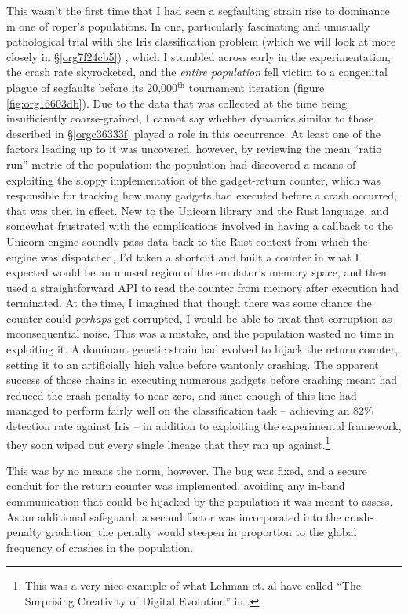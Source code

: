 \documentclass[12pt,glossary]{dalthesis}
\begin{document}
This wasn't the first time that I had seen a segfaulting strain rise to
dominance in one of \gls{roper}'s populations. In one, particularly fascinating
and unusually pathological trial with the Iris classification problem (which we
will look at more closely in \S \ref{org7f24cb5}) , which I stumbled
across early in the experimentation, the crash rate skyrocketed, and the \emph{entire
population} fell victim to a congenital plague of segfaults before its
20,000\(^{\text{th}}\) tournament iteration (figure \ref{fig:org16603db}). Due to the data that
was collected at the time being insufficiently coarse-grained, I cannot say
whether dynamics similar to those described in \S \ref{orgc36333f} played
a role in this occurrence. At least one of the factors leading up to it was
uncovered, however, by reviewing the mean ``ratio run'' metric of the population:
the population had discovered a means of exploiting the sloppy implementation of
the gadget-return counter, which was responsible for tracking how many gadgets
had executed before a crash occurred, that was then in effect. New to the
Unicorn library and the Rust language, and somewhat frustrated with the
complications involved in having a callback to the Unicorn engine soundly pass
data back to the Rust context from which the engine was dispatched, I'd taken a
shortcut and built a counter in what I expected would be an unused region of the
emulator's memory space, and then used a straightforward API to read the counter
from memory after execution had terminated. At the time, I imagined that though
there was some chance the counter could \emph{perhaps} get corrupted, I would be able
to treat that corruption as inconsequential noise. This was a mistake, and the
population wasted no time in exploiting it. A dominant genetic strain had
evolved to hijack the return counter, setting it to an artificially high value
before wantonly crashing. The apparent success of those chains in executing
numerous gadgets before crashing meant had reduced the crash penalty to near
zero, and since enough of this line had managed to perform fairly well on the
classification task -- achieving an 82\% detection rate against Iris -- in
addition to exploiting the experimental framework, they soon wiped out every
single lineage that they ran up against.\footnote{This was a very nice example of
what Lehman et. al have called ``The Surprising Creativity of Digital Evolution''
in \cite{lehman18}.}

This was by no means the norm, however. The bug was fixed, and a secure conduit
for the return counter was implemented, avoiding any in-band communication that
could be hijacked by the population it was meant to assess. As an additional
safeguard, a second factor was incorporated into the crash-penalty gradation:
the penalty would steepen in proportion to the global frequency of crashes in
the population. 
\end{document}

